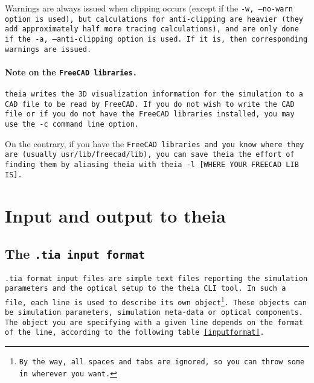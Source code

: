 \documentclass{article}
\begin{document}
Warnings are always issued when clipping occurs (except if the \tt{-w, --no-warn} option is used), but calculations for anti-clipping are heavier (they add approximately half more tracing calculations), and are only done if the \tt{-a, --anti-clipping} option is used. If it is, then corresponding warnings are issued.

\paragraph{Note on the \tt{FreeCAD} libraries.}\tt{theia} writes the 3D visualization information for the simulation to a CAD file to be read by \tt{FreeCAD}. If you do not wish to write the CAD file or if you do not have the \tt{FreeCAD} libraries installed, you may use the \tt{-c} command line option.

On the contrary, if you have the \tt{FreeCAD} libraries and you know where they are (usually \tt{usr/lib/freecad/lib}), you can save \tt{theia} the effort of finding them by aliasing \tt{theia} with \tt{theia -l [WHERE YOUR FREECAD LIB IS]}.


\section{Input and output to theia}
\subsection{The \tt{.tia} input format}
\tt{.tia} format input files are simple text files reporting the simulation parameters and the optical setup to the \tt{theia} CLI tool. In such a file, each line is used to describe its own object\footnote{By the way, all spaces and tabs are ignored, so you can throw some in wherever you want.}. These objects can be simulation parameters, simulation meta-data or optical components. The object you are specifying with a given line depends on the format of the line, according to the following table \ref{inputformat}.
\end{document}
